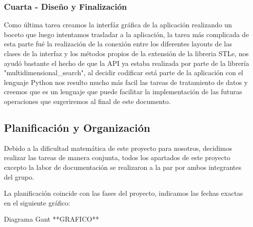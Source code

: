 \subsubsection{Cuarta - Diseño y Finalización}

	Como última tarea creamos la interfáz gráfica de la aplicación realizando un boceto que luego intentamos trasladar a la aplicación, la tarea más complicada de esta parte fué la realización de la conexión entre los diferentes layouts de las clases de la interfaz y los métodos propios de la extensión de la libreria STLe, nos ayudó bastante el hecho de que la API ya estaba realizada por parte de la librería "multidimensional\_search", al decidir codificar está parte de la aplicación con el lenguaje Python nos resulto mucho más facil las tareas de tratamiento de datos y creemos que es un lenguaje que puede facilitar la implementación de las futuras operaciones que sugeriremos al final de este documento. 


\subsection{Planificación y Organización}

Debido a la dificultad matemática de este proyecto para nosotros, decidimos realizar las tareas de manera conjunta, todos los apartados de este proyecto excepto la labor de documentación se realizaron a la par por ambos integrantes del grupo. 

La planificación coincide con las fases del proyecto, indicamos las fechas exactas en el siguiente gráfico: 

Diagrama Gant **GRAFICO**
